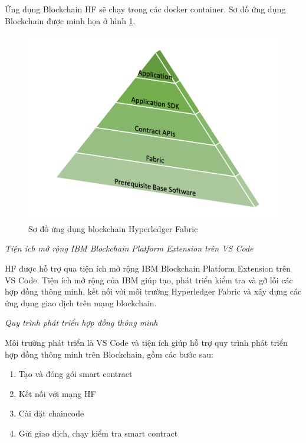 Ứng dụng Blockchain HF sẽ chạy trong các docker container. Sơ đồ ứng dụng Blockchain được minh họa ở hình \ref{fig:getting_started_image2.png}.

\begin{figure}[htbp]
\centering
\includegraphics[width=.9\linewidth]{img/getting_started_image2.png}
\caption{Sơ đồ ứng dụng blockchain Hyperledger Fabric}
\label{fig:getting_started_image2.png}
\end{figure}

\emph{Tiện ích mở rộng  IBM Blockchain Platform Extension trên VS Code}

HF được hỗ trợ  qua tiện ích mở rộng IBM Blockchain Platform Extension trên VS Code. 
Tiện ích mở rộng của IBM giúp tạo,  phát triển kiểm tra và gỡ lỗi các hợp đồng thông minh, kết nối với môi trường Hyperledger Fabric và xây dựng các ứng dụng giao dịch trên mạng blockchain.

\emph{Quy trình phát triển hợp đồng thông minh}

Môi trường phát triển là VS Code và tiện ích giúp hỗ trợ quy trình phát  triển hợp đồng thông minh trên Blockchain, gồm các bước sau:
\begin{enumerate}
	\item Tạo và đóng gói smart contract
	\item Kết nối với mạng HF
	\item Cài đặt chaincode
	\item Gửi giao dịch, chạy kiểm tra smart contract
\end{enumerate}



